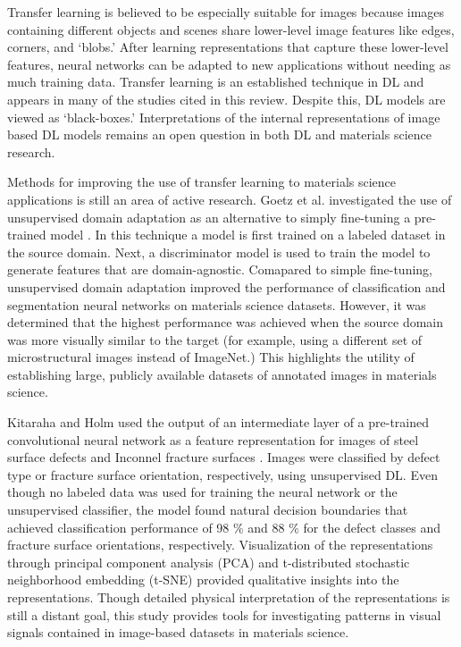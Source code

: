 \documentclass[pdflatex,sn-mathphys]{sn-jnl}%
\theoremstyle{thmstyleone}%
\theoremstyle{thmstyletwo}%
\theoremstyle{thmstylethree}%
\begin{document}
Transfer learning is believed to be especially suitable for images because images containing different objects and scenes share lower-level image features like edges, corners, and `blobs.' After learning representations that capture these lower-level features, neural networks can be adapted to new applications without needing as much training data. Transfer learning is an established technique in DL and appears in many of the studies cited in this review. Despite this, DL models are viewed as `black-boxes.'  Interpretations of the internal representations of image based DL models remains an open question in both DL and materials science research.

Methods for improving the use of transfer learning to materials science applications is still an area of active research.  Goetz et al. investigated the use of unsupervised domain adaptation as an alternative to simply fine-tuning a pre-trained model \cite{goetz2021}. In this technique a model is first trained on a labeled dataset in the source domain. Next, a discriminator model is used to train the model to generate features that are domain-agnostic. Comapared to simple fine-tuning, unsupervised domain adaptation improved the performance of classification and segmentation neural networks on materials science datasets. However, it was determined that the highest performance was achieved when the source domain was more visually similar to the target (for example, using a different set of microstructural images instead of ImageNet.) This highlights the utility of establishing large, publicly available datasets of annotated images in materials science.

Kitaraha and Holm used the output of an intermediate layer of a pre-trained convolutional neural network as a feature representation for images of steel surface defects and Inconnel fracture surfaces \cite{Kitahara2018}. Images were classified by defect type or fracture surface orientation, respectively, using unsupervised DL. Even though no labeled data was used for training the neural network or the unsupervised classifier, the model found natural decision boundaries that achieved classification performance of 98 \% and 88 \% for the defect classes and fracture surface orientations, respectively.  Visualization of the representations through principal component analysis (PCA) and t-distributed stochastic neighborhood embedding (t-SNE) provided qualitative insights into the representations. Though detailed physical interpretation of the representations is still a distant goal, this study provides tools for investigating patterns in visual signals contained in image-based datasets in materials science.
\end{document}
